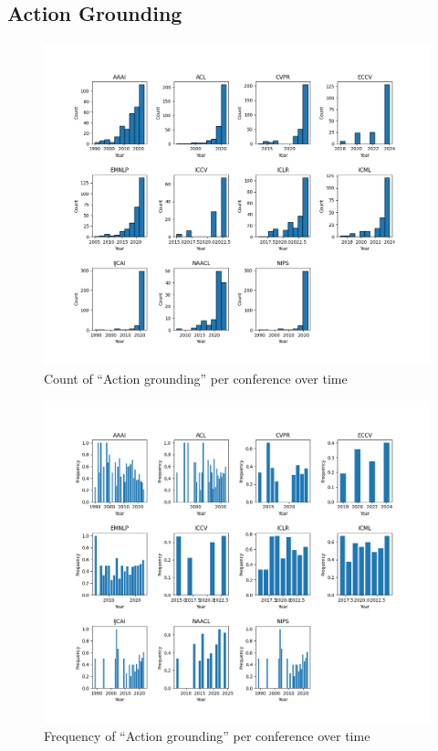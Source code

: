 \documentclass[11pt]{article}
\begin{document}
\subsection{Action Grounding}
\label{sec:appendix_word_sense_years_action}

\begin{figure}[H]
  \includegraphics[width=0.75\columnwidth]{figs/grounding_figs/Action/split_by_conf_grounding_dist.png}
  \centering
  \caption{Count of ``Action grounding'' per conference over time}
  \label{fig:appendix_action_all_confs_count}
\end{figure}

\begin{figure}[H]
  \includegraphics[width=0.75\columnwidth]{figs/freq_grounding_figs/Action/split_by_conf_grounding_dist.png}
  \centering
  \caption{Frequency of ``Action grounding'' per conference over time}
  \label{fig:appendix_action_all_confs_freq}
\end{figure}
\end{document}
